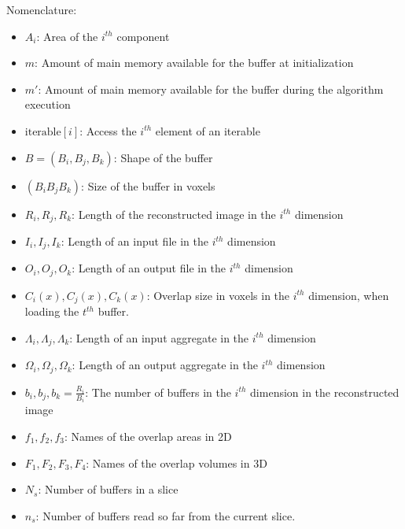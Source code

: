 \documentclass[conference]{IEEEtran}
\begin{document}
Nomenclature:
\begin{itemize}
  \item $A_i$: Area of the $i^{th}$ component
  \item $m$: Amount of main memory available for the buffer at initialization
  \item $m'$: Amount of main memory available for the buffer during the algorithm execution
  \item $\textrm{iterable}[i]$: Access the $i^{th}$ element of an iterable
  \item $B = (B_i, B_j, B_k)$: Shape of the buffer
  \item $(B_i B_j B_k)$: Size of the buffer in voxels
  \item $R_i, R_j, R_k$: Length of the reconstructed image in the $i^{th}$ dimension
  \item $I_i, I_j, I_k$: Length of an input file in the $i^{th}$ dimension
  \item $O_i, O_j, O_k$: Length of an output file in the $i^{th}$ dimension
  \item $C_i(x), C_j(x), C_k(x)$: Overlap size in voxels in the $i^{th}$ dimension, when loading the $t^{th}$ buffer.
  \item $\Lambda_i, \Lambda_j, \Lambda_k$: Length of an input aggregate in the $i^{th}$ dimension
  \item $\Omega_i, \Omega_j, \Omega_k$: Length of an output aggregate in the $i^{th}$ dimension
  \item $b_i, b_j, b_k = \frac{R_i}{B_i}$: The number of buffers in the $i^{th}$ dimension in the reconstructed image
  \item $f_1, f_2, f_3$: Names of the overlap areas in 2D
  \item $F_1, F_2, F_3, F_4$: Names of the overlap volumes in 3D
  \item $ N_s $: Number of buffers in a slice
  \item $ n_s $: Number of buffers read so far from the current slice.
\end{itemize}
\end{document}
